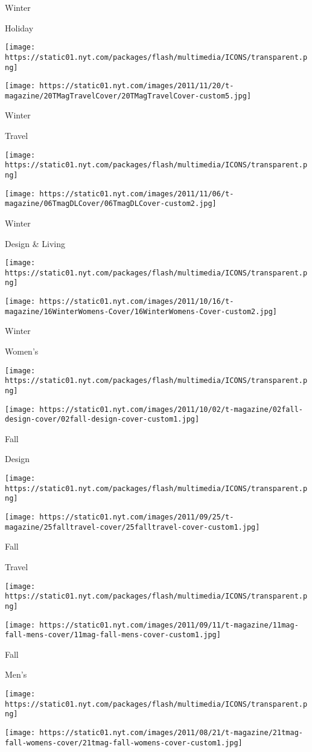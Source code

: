Winter

Holiday

\texttt{[image: https://static01.nyt.com/packages/flash/multimedia/ICONS/transparent.png]}

\texttt{[image: https://static01.nyt.com/images/2011/11/20/t-magazine/20TMagTravelCover/20TMagTravelCover-custom5.jpg]}

Winter

Travel

\texttt{[image: https://static01.nyt.com/packages/flash/multimedia/ICONS/transparent.png]}

\texttt{[image: https://static01.nyt.com/images/2011/11/06/t-magazine/06TmagDLCover/06TmagDLCover-custom2.jpg]}

Winter

Design \& Living

\texttt{[image: https://static01.nyt.com/packages/flash/multimedia/ICONS/transparent.png]}

\texttt{[image: https://static01.nyt.com/images/2011/10/16/t-magazine/16WinterWomens-Cover/16WinterWomens-Cover-custom2.jpg]}

Winter

Women's

\texttt{[image: https://static01.nyt.com/packages/flash/multimedia/ICONS/transparent.png]}

\texttt{[image: https://static01.nyt.com/images/2011/10/02/t-magazine/02fall-design-cover/02fall-design-cover-custom1.jpg]}

Fall

Design

\texttt{[image: https://static01.nyt.com/packages/flash/multimedia/ICONS/transparent.png]}

\texttt{[image: https://static01.nyt.com/images/2011/09/25/t-magazine/25falltravel-cover/25falltravel-cover-custom1.jpg]}

Fall

Travel

\texttt{[image: https://static01.nyt.com/packages/flash/multimedia/ICONS/transparent.png]}

\texttt{[image: https://static01.nyt.com/images/2011/09/11/t-magazine/11mag-fall-mens-cover/11mag-fall-mens-cover-custom1.jpg]}

Fall

Men's

\texttt{[image: https://static01.nyt.com/packages/flash/multimedia/ICONS/transparent.png]}

\texttt{[image: https://static01.nyt.com/images/2011/08/21/t-magazine/21tmag-fall-womens-cover/21tmag-fall-womens-cover-custom1.jpg]}

